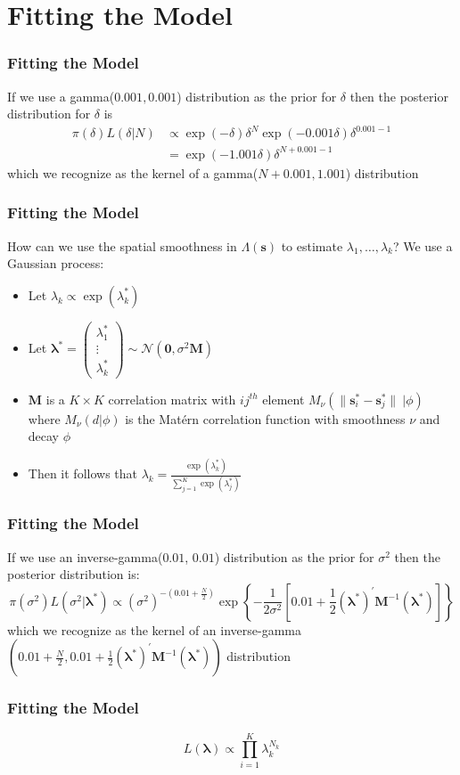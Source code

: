 \documentclass[10pt, compress]{beamer}
\begin{document}
  \section{Fitting the Model}
  \begin{frame}
    \frametitle{Fitting the Model}
      If we use a gamma($0.001, 0.001$) distribution as the prior for $\delta$ 
      then the posterior distribution for $\delta$ is
    \begin{align*} \pi(\delta)L(\delta|N) &\propto \exp(-\delta)\delta^{N}\exp(-0.001\delta)\delta^{0.001-1} \\ &=  \exp(-1.001\delta)\delta^{N+0.001-1} \end{align*}
    which we recognize as the kernel of a gamma($N+0.001, 1.001$) distribution
  \end{frame}
  \begin{frame}
    \frametitle{Fitting the Model}
    How can we use the spatial smoothness in $\Lambda(\mathbf{s})$ to estimate $\lambda_1, \dots, \lambda_k$?
    \newline
    \newline
    We use a Gaussian process:
    \begin{itemize}
      \item Let $\lambda_k \propto \exp(\lambda_k^{*})$
      \item Let $\boldsymbol{\lambda}^{*} = \begin{pmatrix} \lambda_1^{*} \\ \vdots \\ \lambda_k^{*} \end{pmatrix} \sim \mathcal{N}(\mathbf{0}, \sigma^2\mathbf{M})$
      \item $\mathbf{M}$ is a $K \times K$ correlation matrix with $ij^{th}$ element $M_{\nu}(\|\mathbf{s}_i^{*}-\mathbf{s}_j^{*}\|~| \phi)$ where $M_{\nu}(d | \phi)$
            is the Mat\'{e}rn correlation function with smoothness $\nu$ and decay $\phi$
      \item Then it follows that $\lambda_k = \frac{\exp(\lambda_k^{*})}{\sum_{j=1}^{K}\exp(\lambda_j^{*})}$

    \end{itemize}
  \end{frame}
  \begin{frame}
    \frametitle{Fitting the Model}
    If we use an inverse-gamma($0.01$, $0.01$) distribution as the prior for $\sigma^2$ then the posterior distribution is:
    $$ \pi(\sigma^2)L(\sigma^2|\boldsymbol\lambda^{*}) \propto 
      (\sigma^2)^{-(0.01+\frac{N}{2})}\exp\left\{-\frac{1}{2\sigma^2}\left[0.01+\frac{1}{2}(\boldsymbol\lambda^{*})^{'}\mathbf{M}^{-1}(\boldsymbol\lambda^{*})\right]\right\}
    $$
    which we recognize as the kernel of an inverse-gamma$(0.01+\frac{N}{2}, 0.01+\frac{1}{2}(\boldsymbol\lambda^{*})^{'}\mathbf{M}^{-1}(\boldsymbol\lambda^{*}))$
    distribution
  \end{frame}
  \begin{frame}
    \frametitle{Fitting the Model}
    $$ L(\boldsymbol\lambda) \propto \prod_{i=1}^{K}\lambda_k^{N_k} $$
  \end{frame}
\end{document}
